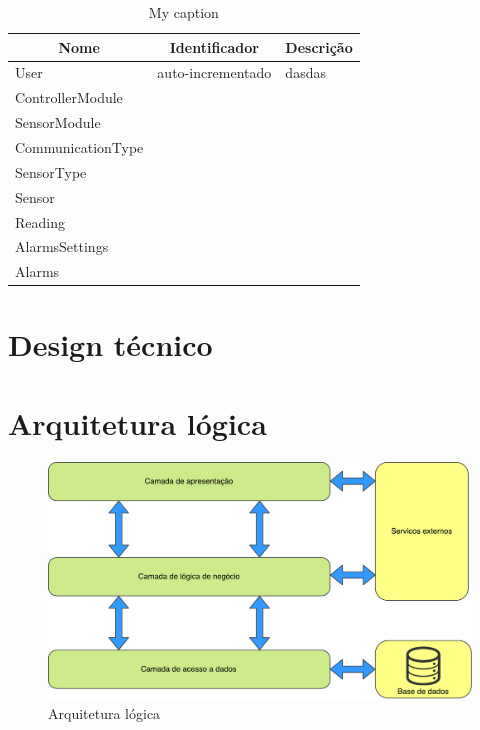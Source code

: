\newpage

\begin{table}[h]
	\centering
	\begin{tabular}{|l|l|l|}
		\hline
		\multicolumn{1}{|c|}{\textbf{Nome}} & \multicolumn{1}{c|}{\textbf{Identificador}} & \multicolumn{1}{c|}{\textbf{Descrição}} \\ \hline
		User & auto-incrementado & dasdas \\ \hline
		ControllerModule&  &  \\ \hline
		SensorModule&  &  \\ \hline
		CommunicationType&  &  \\ \hline
		SensorType&  &  \\ \hline
		Sensor&  &  \\ \hline
		Reading&  &  \\ \hline
		AlarmsSettings&  &  \\ \hline
		Alarms&  &  \\ \hline
	\end{tabular}
	\caption{My caption}
	\label{my-label}
\end{table}









\newpage












\section{Design técnico}


\newpage
\section{Arquitetura lógica}



\begin{figure}[!htb]
	\centering
	\includegraphics[width=\linewidth]{esquemas/arquitetura-logica.pdf}
	\caption{Arquitetura lógica}
	\label{opencvlogo}
\end{figure}



